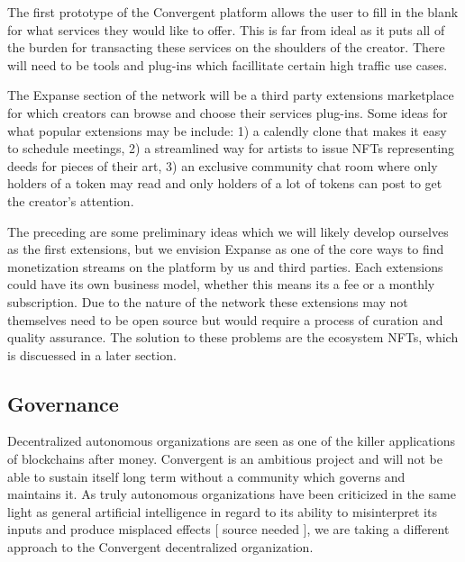\documentclass[a4paper, 10pt]{article}
\begin{document}
The first prototype of the Convergent platform allows the user to fill in the blank for what services they would like to offer. This is far from ideal as it puts all of the burden for transacting these services on the shoulders of the creator. There will need to be tools and plug-ins which facillitate certain high traffic use cases.

The Expanse section of the network will be a third party extensions marketplace for which creators can browse and choose their services plug-ins. Some ideas for what popular extensions may be include: 1) a calendly clone that makes it easy to schedule meetings, 2) a streamlined way for artists to issue NFTs representing deeds for pieces of their art, 3) an exclusive community chat room where only holders of a token may read and only holders of a lot of tokens can post to get the creator's attention. 

The preceding are some preliminary ideas which we will likely develop ourselves as the first extensions, but we envision Expanse as one of the core ways to find monetization streams on the platform by us and third parties. Each extensions could have its own business model, whether this means its a fee or a monthly subscription. Due to the nature of the network these extensions may not themselves need to be open source but would require a process of curation and quality assurance. The solution to these problems are the ecosystem NFTs, which is discuessed in a later section.

\subsection{Governance}

Decentralized autonomous organizations are seen as one of the killer applications of blockchains after money. Convergent is an ambitious project and will not be able to sustain itself long term without a community which governs and maintains it. As truly autonomous organizations have been criticized in the same light as general artificial intelligence in regard to its ability to misinterpret its inputs and produce misplaced effects [ source needed ], we are taking a different approach to the Convergent decentralized organization.
\end{document}
